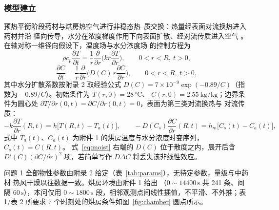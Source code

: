 \subsubsection{模型建立}

预热平衡阶段药材与烘房热空气进行非稳态热--质交换：热量经表面对流换热进入药材并沿
径向传导，水分在浓度梯度作用下向表面扩散、经对流传质进入空气
\cite{yan2026heat,srikiatden2007moisture}。在轴对称一维径向假设下，温度场与水分浓度场
的控制方程为
\begin{equation}
  \rho c_p\frac{\partial T}{\partial t}
  =\frac{1}{r}\frac{\partial}{\partial r}\Big(k r\frac{\partial T}{\partial r}\Big),
  \qquad 0<r<R,\ t>0,
  \label{eq:heat}
\end{equation}
\begin{equation}
  \frac{\partial C}{\partial t}
  =\frac{1}{r}\frac{\partial}{\partial r}\Big(D(C)\,r\frac{\partial C}{\partial r}\Big),
  \qquad 0<r<R,\ t>0,
  \label{eq:moist}
\end{equation}
其中水分扩散系数按附录 2 取经验公式 $D(C)=7\times10^{-9}\exp(-0.89/C)$（指数为
$-0.89/C$）。初始条件为 $T(r,0)=28\,^{\circ}\mathrm{C}$、
$C(r,0)=2.55\ \mathrm{kg/kg}$；边界条件为圆心处
$\partial T/\partial r(0,t)=\partial C/\partial r(0,t)=0$，表面为第三类对流换热与
对流传质：
\begin{equation}
  -k\frac{\partial T}{\partial r}(R,t)=h\big[T(R,t)-T_a(t)\big],
  \qquad
  -D(C_s)\frac{\partial C}{\partial r}(R,t)=h_m\big[C_s(t)-C_a(t)\big],
  \label{eq:bcR}
\end{equation}
式中 $T_a(t)$、$C_a(t)$ 为附件 1 的烘房温度与水分浓度时变序列，$C_s(t)=C(R,t)$。
式~\eqref{eq:moist} 右端的 $D(C)$ 位于散度之内，展开后含
$D'(C)(\partial C/\partial r)^2$ 项，若简单写作 $D\Delta C$ 将丢失该非线性效应。

问题 1 全部物性参数由附录 2 给定（表~\ref{tab:params}），无待定参数，量级与中药材
热风干燥以往数据一致\cite{wang2024drying}。烘房环境由附件 1 给出
（$0\sim14400\,\mathrm{s}$ 共 241 条、间隔 $60\,\mathrm{s}$），本问仅用
$0\sim1800\,\mathrm{s}$ 段，相邻观测点间线性插值，不平滑、不外推；表 1/表 2 所要求
7 个时刻处的烘房条件如图~\ref{fig:chamber} 圆点所示。

